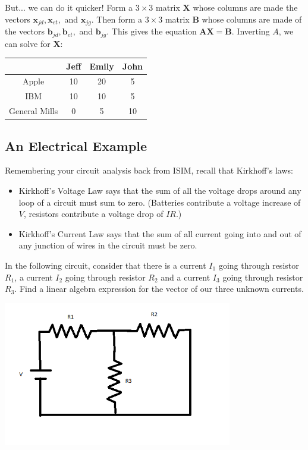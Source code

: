\begin{sol}
\begin{enumerate}
		But... we can do it quicker! Form a $3 \times 3$ matrix $\mathbf{X}$ whose columns are made the vectors $\mathbf{x}_{jd}, \mathbf{x}_{et},$ and $\mathbf{x}_{jg}$. Then form a $3 \times 3$ matrix $\mathbf{B}$ whose columns are made of the vectors $\mathbf{b}_{jd}, \mathbf{b}_{et},$ and $\mathbf{b}_{jg}$. This gives the equation $\mathbf{AX}=\mathbf{B}$. Inverting $A$, we can solve for $\mathbf{X}$:
		\begin{center}
		\begin{tabular}{|c|c|c|c|}
				\hline
				& Jeff & Emily & John \\
				\hline
				Apple & 10 & 20 & 5 \\
				IBM & 10 & 10 & 5\\
				General Mills & 0 & 5 & 10 \\
				\hline
			\end{tabular}
		\end{center}
	\end{enumerate}
\end{sol}


\subsection{An Electrical Example}

Remembering your circuit analysis back from ISIM, recall that Kirkhoff's laws:
\begin{itemize}
\item  Kirkhoff's Voltage Law says that the sum of all the voltage drops around any loop of a circuit must sum to zero.  (Batteries contribute a voltage increase of $V$, resistors contribute a voltage drop of $IR$.)
\item Kirkhoff's Current Law says that the sum of all current going into and out of any junction of wires in the circuit must be zero.
\end{itemize}

\begin{prob}
In the following circuit, consider that there is a current $I_1$ going through resistor $R_1$, a current $I_2$ going through resistor $R_2$ and a current $I_3$ going through resistor $R_3$.  Find a linear algebra expression for the vector of our three unknown currents.
\begin{center}
\includegraphics[width=0.75\textwidth]{FacesNight2/figs/SimpleCircuit}
\end{center}
\end{prob}

